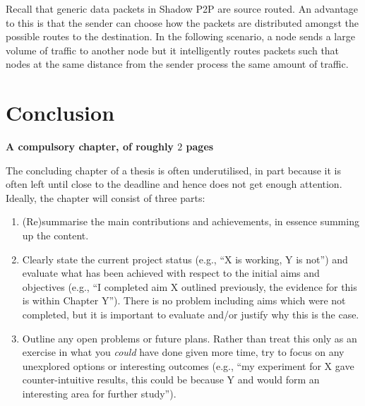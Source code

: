 \documentclass[ %
                    author={Luke Murray},
                supervisor={Dr. Simon Hollis},
                     title={Shadow Peer-to-Peer Networks},
                  subtitle={},
                    degree={MEng},
                      year={2013} ]{thesis}
\begin{document}
Recall that generic data packets in Shadow P2P are source routed. An advantage to this is that the sender can choose how the packets are distributed amongst the possible routes to the destination. In the following scenario, a node sends a large volume of traffic to another node but it intelligently routes packets such that nodes at the same distance from the sender process the same amount of traffic.


\chapter{Conclusion}
\label{chap:conclusion}

{\bf A compulsory chapter, of roughly $2$ pages} 
\vspace{1cm} 

\noindent
The concluding chapter of a thesis is often underutilised, in part because
it is often left until close to the deadline and hence does not get enough 
attention.  Ideally, the chapter will consist of three parts:

\begin{enumerate}
\item (Re)summarise the main contributions and achievements, in essence
      summing up the content.
\item Clearly state the current project status (e.g., ``X is working, Y 
      is not'') and evaluate what has been achieved with respect to the 
      initial aims and objectives (e.g., ``I completed aim X outlined 
      previously, the evidence for this is within Chapter Y'').  There 
      is no problem including aims which were not completed, but it is 
      important to evaluate and/or justify why this is the case.
\item Outline any open problems or future plans.  Rather than treat this
      only as an exercise in what you {\em could} have done given more 
      time, try to focus on any unexplored options or interesting outcomes
      (e.g., ``my experiment for X gave counter-intuitive results, this 
      could be because Y and would form an interesting area for further 
      study'').
\end{enumerate}


%
%
\end{document}
